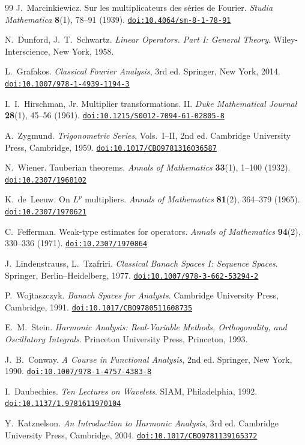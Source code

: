 \documentclass[a4paper,12pt]{article}
\theoremstyle{definition}
\theoremstyle{remark}
\theoremstyle{definition}
\newcommand{\DOI}[1]{\href{https://doi.org/#1}{\nolinkurl{doi:#1}}}
\begin{document}
\begin{thebibliography}{99}
J.~Marcinkiewicz.
\newblock Sur les multiplicateurs des s\'eries de Fourier.
\newblock \emph{Studia Mathematica} \textbf{8}(1), 78--91 (1939).
\newblock \DOI{10.4064/sm-8-1-78-91}

N.~Dunford, J.~T.~Schwartz.
\newblock \emph{Linear Operators. Part I: General Theory}.
\newblock Wiley-Interscience, New York, 1958.

L.~Grafakos.
\newblock \emph{Classical Fourier Analysis}, 3rd ed.
\newblock Springer, New York, 2014.
\newblock \DOI{10.1007/978-1-4939-1194-3}

I.~I.~Hirschman, Jr.
\newblock Multiplier transformations. II.
\newblock \emph{Duke Mathematical Journal} \textbf{28}(1), 45--56 (1961).
\newblock \DOI{10.1215/S0012-7094-61-02805-8}

A.~Zygmund.
\newblock \emph{Trigonometric Series}, Vols.~I--II, 2nd ed.
\newblock Cambridge University Press, Cambridge, 1959.
\newblock \DOI{10.1017/CBO9781316036587}

N.~Wiener.
\newblock Tauberian theorems.
\newblock \emph{Annals of Mathematics} \textbf{33}(1), 1--100 (1932).
\newblock \DOI{10.2307/1968102}

K.~de~Leeuw.
\newblock On $L^{p}$ multipliers.
\newblock \emph{Annals of Mathematics} \textbf{81}(2), 364--379 (1965).
\newblock \DOI{10.2307/1970621}

C.~Fefferman.
\newblock Weak-type estimates for operators.
\newblock \emph{Annals of Mathematics} \textbf{94}(2), 330--336 (1971).
\newblock \DOI{10.2307/1970864}

J.~Lindenstrauss, L.~Tzafriri.
\newblock \emph{Classical Banach Spaces I: Sequence Spaces}.
\newblock Springer, Berlin--Heidelberg, 1977.
\newblock \DOI{10.1007/978-3-662-53294-2}

P.~Wojtaszczyk.
\newblock \emph{Banach Spaces for Analysts}.
\newblock Cambridge University Press, Cambridge, 1991.
\newblock \DOI{10.1017/CBO9780511608735}

E.~M.~Stein.
\newblock \emph{Harmonic Analysis: Real-Variable Methods, Orthogonality,
and Oscillatory Integrals}.
\newblock Princeton University Press, Princeton, 1993.

J.~B.~Conway.
\newblock \emph{A Course in Functional Analysis}, 2nd ed.
\newblock Springer, New York, 1990.
\newblock \DOI{10.1007/978-1-4757-4383-8}

I.~Daubechies.
\newblock \emph{Ten Lectures on Wavelets}.
\newblock SIAM, Philadelphia, 1992.
\newblock \DOI{10.1137/1.9781611970104}

Y.~Katznelson.
\newblock \emph{An Introduction to Harmonic Analysis}, 3rd ed.
\newblock Cambridge University Press, Cambridge, 2004.
\newblock \DOI{10.1017/CBO9781139165372}

\end{thebibliography}
\end{document}
